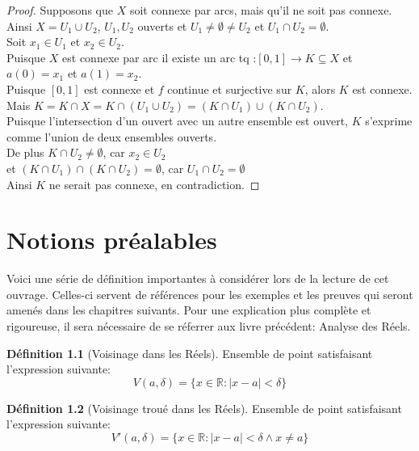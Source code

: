 \documentclass[12pt]{book}
\let\Bbb\mathbb
\def\sep{\phantom{}}
\theoremstyle{definition}
\newtheorem{definition}{Définition}[section]
\begin{document}
\begin{proof}
    Supposons que $X$ soit connexe par arcs, mais qu'il ne soit pas connexe.\\\sep
    Ainsi $X = U_1 \cup U_2$, $U_1, U_2$ ouverts et $U_1 \neq \emptyset \neq U_2$ et $U_1 \cap U_2 = \emptyset$. \\\sep
    Soit $x_1 \in U_1$ et $x_2 \in U_2$. \\\sep
    Puisque $X$ est connexe par arc il existe un arc tq :$[0,1] \to K \subseteq X$ et $a(0) = x_1$ et $a(1) = x_2$. \\\sep 
    Puisque $[0,1]$ est connexe et $f$ continue et surjective sur $K$, alors $K$ est connexe. \\\sep 
    Mais $K = K \cap X = K \cap (U_1 \cup U_2) = (K \cap U_1) \cup (K \cap U_2)$. \\\sep 
    Puisque l'intersection d'un ouvert avec un autre ensemble est ouvert, $K$ s'exprime comme l'union de deux ensembles ouverts. \\\sep 
    De plus $K \cap U_2 \neq \emptyset$, car $x_2 \in U_2$ \\\sep 
    et $(K \cap U_1) \cap (K \cap U_2) = \emptyset$, car $U_1 \cap U_2 = \emptyset$ \\\sep 
    Ainsi $K$ ne serait pas connexe, en contradiction.
\end{proof}
\appendix
\chapter{Notions préalables}
Voici une série de définition importantes à considérer lors de la lecture de cet ouvrage. Celles-ci servent
de références pour les exemples et les preuves qui seront amenés dans les chapitres suivants. Pour une explication
plus complète et rigoureuse, il sera nécessaire de se réferrer aux livre précédent: Analyse des Réels.

\begin{definition}[Voisinage dans les Réels]
    \label{def:voisinage_reels}
    Ensemble de point satisfaisant l'expression
    suivante: $$V(a, \delta) = \{ x \in \Bbb R : |x - a| < \delta \}$$
\end{definition}

\begin{definition}[Voisinage troué dans les Réels]
    \label{def:voisinage_troue_reels}
    Ensemble de point satisfaisant l'expression
    suivante: $$V'(a, \delta) = \{ x \in \Bbb R : |x - a| < \delta \land x \neq a \}$$
\end{definition}
\end{document}
